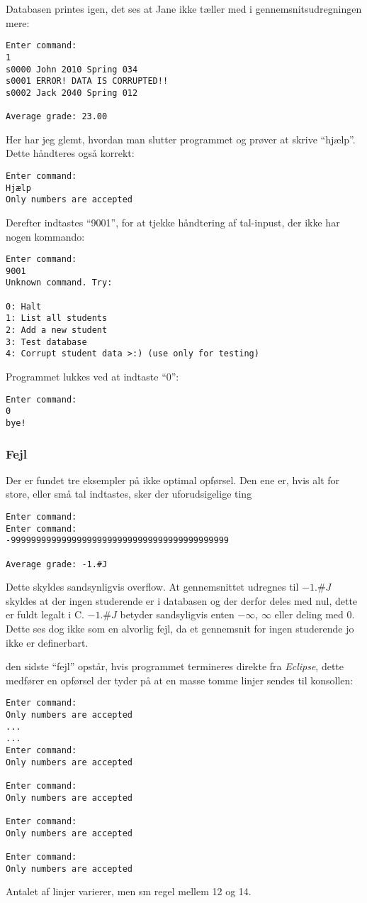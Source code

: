 Databasen printes igen, det ses at Jane ikke tæller med i gennemsnitsudregningen
mere:
\begin{lstlisting}[caption=Print af korrupt database]
Enter command: 
1
s0000 John 2010 Spring 034
s0001 ERROR! DATA IS CORRUPTED!!
s0002 Jack 2040 Spring 012

Average grade: 23.00
\end{lstlisting}

Her har jeg glemt, hvordan man slutter programmet og prøver at skrive ``hjælp''.
Dette håndteres også korrekt:
\begin{lstlisting}[caption=Tekst i kommandofelt]
Enter command: 
Hjælp
Only numbers are accepted
\end{lstlisting}

Derefter indtastes ``9001'', for at tjekke håndtering af tal-inpust, der ikke
har nogen kommando:
\begin{lstlisting}[caption=Kommandol\oe dst tal i kommandofelt]
Enter command: 
9001
Unknown command. Try:

0: Halt
1: List all students
2: Add a new student
3: Test database
4: Corrupt student data >:) (use only for testing)
\end{lstlisting}

Programmet lukkes ved at indtaste ``0'':
\begin{lstlisting}[caption=afslutnign af program]
Enter command: 
0
bye!
\end{lstlisting}

\subsubsection{Fejl}
Der er fundet tre eksempler på ikke optimal opførsel.
Den ene er, hvis alt for store, eller små tal indtastes, sker der uforudsigelige
ting
\begin{lstlisting}[caption=Afslutnign af program]
Enter command: 
Enter command: 
-9999999999999999999999999999999999999999999

Average grade: -1.#J
\end{lstlisting}
Dette skyldes sandsynligvis overflow.
At gennemsnittet udregnes til $-1.\#J$ skyldes at der ingen studerende er i
databasen og der derfor deles med nul, dette er fuldt legalt i C. $-1.\#J$
betyder sandsyligvis enten $-\infty$, $\infty$ eller deling med $0$.
Dette ses dog ikke som en alvorlig fejl, da et gennemsnit for ingen studerende
jo ikke er definerbart.

den sidste ``fejl'' opstår, hvis programmet termineres direkte fra
\emph{Eclipse}, dette medfører en opførsel der tyder på at en masse tomme linjer
sendes til konsollen:
\begin{lstlisting}[caption=Terminering af program fra Eclipse]
Enter command: 
Only numbers are accepted
...
...
Enter command: 
Only numbers are accepted

Enter command: 
Only numbers are accepted

Enter command: 
Only numbers are accepted

Enter command: 
Only numbers are accepted
\end{lstlisting}
Antalet af linjer varierer, men sm regel mellem 12 og 14.



